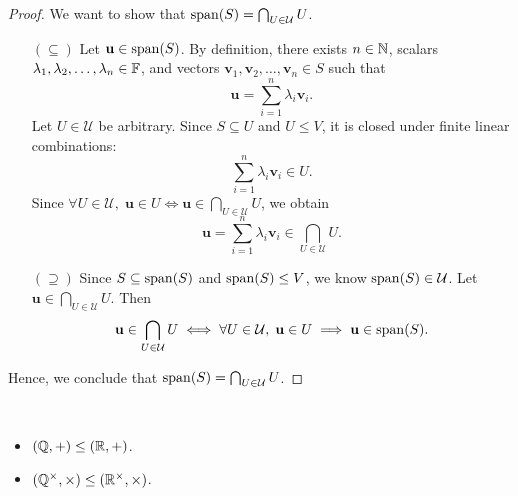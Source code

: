 \documentclass[11pt,openany]{article}
\renewcommand{\vec}[1]{\mathbf{#1}}
\begin{document}
\begin{proof}
We want to show that $\operatorname{\normalfont span}(S)=\bigcap_{U\in\mathcal{U}}U$.
\begin{itemize}
	\item[$(\subseteq)$] Let $\vec{u}\in\Span(S)$. By definition, there exists $n\in\mathbb{N}$, scalars $\lambda_1,\lambda_2,\dots,\lambda_n\in\mathbb{F}$, and vectors $\vec{v}_1,\vec{v}_2,\dots,\vec{v}_n\in S$ such that \[
	\vec{u}=\sum_{i=1}^n\lambda_i\vec{v}_i.
	\] Let $U\in\mathcal{U}$ be arbitrary. Since $S\subseteq U$ and $U\leq V$, it is closed under finite linear combinations: \[
	\sum_{i=1}^n\lambda_i\vec{v}_i\in U.
	\] Since $\forall U\in\mathcal{U},\; \vec{u}\in U\Leftrightarrow \vec{u}\in\bigcap_{U\in\mathcal{U}} U$, we obtain \[
	\vec{u}=\sum_{i=1}^n\lambda_i\vec{v}_i\in\bigcap_{U\in\mathcal{U}}U.
	\]
	\item[$(\supseteq)$] Since $S\subseteq\operatorname{\normalfont span}(S)$ and $\operatorname{\normalfont span}(S)\leq V$, we know $\operatorname{\normalfont span}(S)\in\mathcal{U}$. Let $\vec{u}\in\bigcap_{U\in\mathcal{U}}U$. Then \[
	\vec{u}\in\bigcap_{U\in\mathcal{U}}U\iff \forall U\in\mathcal{U},\; \vec{u}\in U\implies \vec{u}\in\Span(S).
	\]
\end{itemize} Hence, we conclude that $\operatorname{\normalfont span}(S)=\bigcap_{U\in\mathcal{U}}U$.
\end{proof}
\vfill
{}
\begin{example*}
\ \begin{itemize}
	\item $(\mathbb{Q},+)\leq(\mathbb{R},+)$.
	\item $(\mathbb{Q}^\times,\times)\leq(\mathbb{R}^\times,\times)$.
\end{itemize}
\end{example*}
\end{document}
